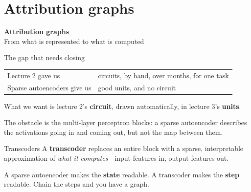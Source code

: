 \documentclass[aspectratio=169]{beamer}
\newcommand{\keybox}[1]{%
  \begin{tcolorbox}[colback=armblue!8, colframe=armblue, boxrule=0.6pt, arc=2pt]
  #1
  \end{tcolorbox}}
\newcommand{\takebox}[1]{%
  \begin{tcolorbox}[colback=paramgreen!8, colframe=paramgreen, boxrule=0.6pt, arc=2pt]
  #1
  \end{tcolorbox}}
\newcommand{\sectiontransition}[2]{%
  \begin{frame}[plain]
    \vfill
    \begin{center}
      {\Huge\bfseries\color{popblue} #1}\\[1.1em]
      {\large #2}
    \end{center}
    \vfill
  \end{frame}}
\begin{document}
\section{Attribution graphs}
\sectiontransition{Attribution graphs}{From what is represented to what is computed}

\begin{frame}{The gap that needs closing}
  \vspace{0.8em}
  \begin{center}
  \small
  \begin{tabular}{@{}ll@{}}
    \toprule
    Lecture 2 gave us & circuits, by hand, over months, for one task\\
    Sparse autoencoders give us & good units, and no circuit\\
    \bottomrule
  \end{tabular}
  \end{center}

  \vspace{1.0em}
  \keybox{What we want is lecture 2's \textbf{circuit}, drawn automatically, in lecture 3's
  \textbf{units}.}

  \vspace{1.0em}
  The obstacle is the multi-layer perceptron blocks: a sparse autoencoder describes the
  activations going in and coming out, but not the map between them.
\end{frame}

\begin{frame}{Transcoders}
  \vspace{0.9em}
  A \textbf{transcoder} replaces an entire block with a sparse, interpretable approximation of
  \emph{what it computes} - input features in, output features out.

  \vspace{0.9em}
  \begin{center}
  \end{center}

  \vspace{0.9em}
  \takebox{A sparse autoencoder makes the \textbf{state} readable. A transcoder makes the
  \textbf{step} readable. Chain the steps and you have a graph.}
\end{frame}
\end{document}
